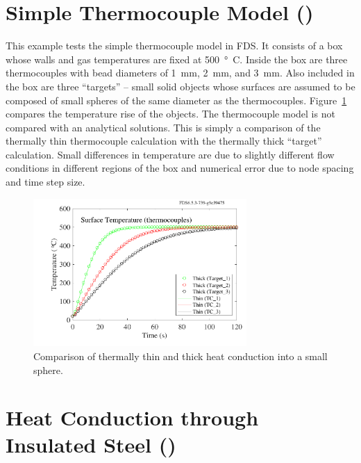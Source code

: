 \documentclass[11pt]{book}
\begin{document}
\clearpage

\section{Simple Thermocouple Model (\texorpdfstring{}{thermocouples})}

This example tests the simple thermocouple model in FDS. It consists of a box whose walls and gas temperatures are fixed at 500~\si{\degree C}. Inside the box are three
thermocouples with bead diameters of 1~mm, 2~mm, and 3~mm. Also included in the box are three ``targets'' -- small solid objects whose surfaces are assumed to be composed of
small spheres of the same diameter as the thermocouples. Figure~\ref{thermocouples} compares the temperature rise of the objects. The thermocouple model is not compared
with an analytical solutions. This is
simply a comparison of the thermally thin thermocouple calculation with the thermally thick ``target'' calculation. Small differences in temperature are due to slightly different
flow conditions in different regions of the box and numerical error due to node spacing and time step size.

\begin{figure}[ht]
\noindent
\begin{center}
\includegraphics[width=3.2in]{SCRIPT_FIGURES/thermocouples}
\end{center}
\caption[The  test case]{Comparison of thermally thin and thick heat conduction into a small sphere.}
\label{thermocouples}
\end{figure}


\clearpage

\section{Heat Conduction through Insulated Steel (\texorpdfstring{}{insulated\_steel\_x})}
\end{document}
